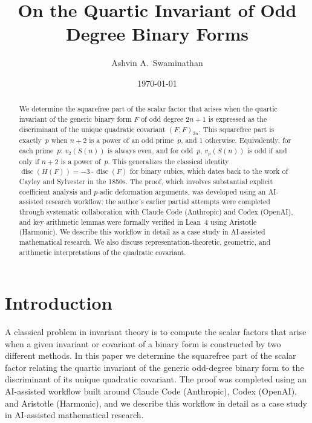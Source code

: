 \documentclass[10pt]{amsart}
\title[On the Quartic Invariant of Odd Degree Binary Forms]{On the Quartic Invariant of Odd Degree Binary Forms}
\author{Ashvin A.~Swaminathan \vspace*{-0.3in}}
\date{\today}
\theoremstyle{definition}
\theoremstyle{remark}
\DeclareMathOperator{\disc}{disc}
\begin{document}
\maketitle

\begin{abstract}
We determine the squarefree part of the scalar factor that arises
when the quartic invariant of the generic binary form $F$ of odd
degree $2n+1$ is expressed as the discriminant of the unique
quadratic covariant $(F,F)_{2n}$.  This squarefree part is exactly~$p$
when $n+2$ is a power of an odd prime~$p$, and $1$ otherwise.
Equivalently, for each prime~$p$: $v_2(S(n))$ is always even, and for
odd~$p$, $v_p(S(n))$ is odd if and only if $n+2$ is a power of~$p$.  This
generalizes the classical identity $\disc(H(F))=-3\cdot\disc(F)$ for
binary cubics, which dates back to the work of Cayley and Sylvester in
the 1850s.  The proof, which involves substantial explicit coefficient
analysis and $p$-adic deformation arguments, was developed using an
AI-assisted research workflow\textup{:} the author's earlier partial
attempts were completed through systematic collaboration with Claude Code
(Anthropic) and Codex (OpenAI), and key arithmetic lemmas were formally verified in Lean~4 using
Aristotle \cite{Aristotle2025} (Harmonic).  We describe this workflow in detail as a case study in
AI-assisted mathematical research.  We also discuss representation-theoretic,
geometric, and arithmetic interpretations of the quadratic covariant.
\end{abstract}

\section{Introduction}\label{sec:intro}

A classical problem in invariant theory is to compute the scalar
factors that arise when a given invariant or covariant of a binary form
is constructed by two different methods.  In this paper we determine the
squarefree part of the scalar factor relating the quartic invariant
of the generic odd-degree binary form to the discriminant of its
unique quadratic covariant.  The proof was completed using
an AI-assisted workflow built around Claude Code (Anthropic), Codex (OpenAI), and
Aristotle \cite{Aristotle2025} (Harmonic), and we describe this workflow in detail as a case
study in AI-assisted mathematical research.
\end{document}
